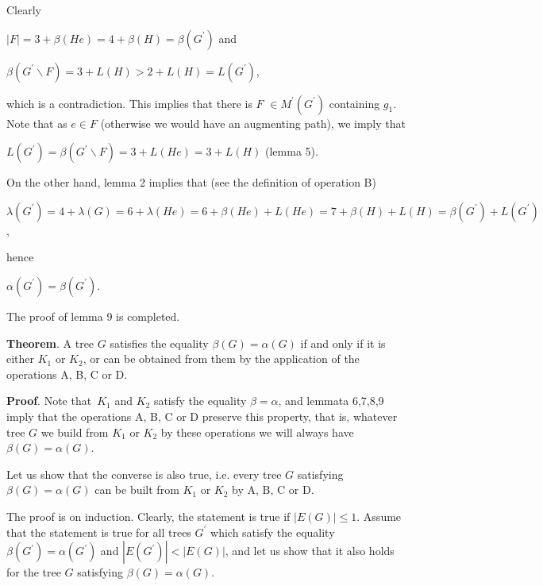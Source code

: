 \documentclass{article}
\begin{document}
Clearly

\begin{center}
$\left\vert F\right\vert =3+\beta (He)=4+\beta (H)=\beta (G^{\prime })$ and

$\beta (G^{\prime }\backslash F)=3+L(H)>2+L(H)=L(G^{\prime })$,
\end{center}

which is a contradiction. This implies that there is $F$ $\in M^{\prime
}(G^{\prime })$ containing $g_{1}$. Note that as $e\in F$ (otherwise we
would have an augmenting path), we imply that

\begin{center}
$L(G^{\prime })=\beta (G^{\prime }\backslash F)=3+L(He)=3+L(H)$ (lemma 5).
\end{center}

On the other hand, lemma 2 implies that (see the definition of operation B)

\begin{center}
$\lambda (G^{\prime })=4+\lambda (G)=6+\lambda (He)=6+\beta
(He)+L(He)=7+\beta (H)+L(H)=\beta (G^{\prime })+L(G^{\prime })$,
\end{center}

hence

\begin{center}
$\alpha (G^{\prime })=\beta (G^{\prime })$.
\end{center}

The proof of lemma 9 is completed.

\bigskip

\textbf{Theorem}. A tree $G$ satisfies the equality $\beta (G)=\alpha (G)$
if and only if it is either $K_{1}$ or $K_{2}$, or can be obtained from them
by the application of the operations A, B, C or D.

\textbf{Proof}. Note that\ $K_{1}$ and $K_{2}$ satisfy the equality $\beta
=\alpha $, and lemmata 6,7,8,9 imply that the operations A, B, C or D
preserve this property, that is, whatever tree $G$ we build from $K_{1}$ or $K_{2}$ by these operations we will always have $\beta (G)=\alpha (G)$.

Let us show that the converse is also true, i.e. every tree $G$ satisfying $\beta (G)=\alpha (G)$ can be built from $K_{1}$ or $K_{2}$ by A, B, C or D.

The proof is on induction. Clearly, the statement is true if $\left\vert
E(G)\right\vert \leq 1$. Assume that the statement is true for all trees $G^{\prime }$ which satisfy the equality $\beta (G^{\prime })=\alpha
(G^{\prime })$ and $\left\vert E(G^{\prime })\right\vert <\left\vert
E(G)\right\vert $, and let us show that it also holds for the tree $G$
satisfying $\beta (G)=\alpha (G)$.
\end{document}
